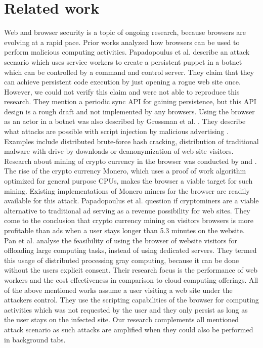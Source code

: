 \documentclass[
	ruledheaders=section,%
	class=report,%
	thesis={type=bachelor},%
	accentcolor=9c,%
	custommargins=true,%
	marginpar=false,%
	parskip=half-,%
	fontsize=11pt,%
]{tudapub}
\begin{document}
  

  
  \newpage
  \chapter{Related work}

  Web and browser security is a topic of ongoing research, because browsers are evolving at a rapid pace. Prior works analyzed how browsers can be used to perform malicious computing activities. Papadopoulus et al. \cite{papadopoulos2018master} describe an attack scenario which uses service workers to create a persistent puppet in a botnet which can be controlled by a command and control server. They claim that they can achieve persistent code execution by just opening a rogue web site once. However, we could not verify this claim and were not able to reproduce this research. They mention a periodic sync API for gaining persistence, but this API design is a rough draft and not implemented by any browsers. Using the browser as an actor in a botnet was also described by Grossman et al. \cite{grossmann2013million}. They describe what attacks are possible with script injection by malicious advertising \cite{wiki:malvertising}. Examples include distributed brute-force hash cracking, distribution of traditional malware with drive-by downloads or deanonymization of web site visitors. Research about mining of crypto currency in the browser was conducted by \cite{eskandari2018first} and \cite{rueth2018digging}. The rise of the crypto currency Monero, which uses a proof of work algorithm optimized for general purpose CPUs, makes the browser a viable target for such mining. Existing implementations of Monero miners for the browser are readily available for this attack. Papadopoulus et al. \cite{papadopoulos2018truth} question if cryptominers are a viable alternative to traditional ad serving as a revenue possibility for web sites. They come to the conclusion that crypto currency mining on visitors browsers is more profitable than ads when a user stays longer than 5.3 minutes on the website. Pan et al. \cite{pan2015gray} analyse the feasibility of using the browser of website visitors for offloading large computing tasks, instead of using dedicated servers. They termed this usage of distributed processing gray computing, because it can be done without the users explicit consent. Their research focus is the performance of web workers and the cost effectiveness in comparison to cloud computing offerings. All of the above mentioned works assume a user visiting a web site under the attackers control. They use the scripting capabilities of the browser for computing activities which was not requested by the user and they only persist as long as the user stays on the infected site. Our research complements all mentioned attack scenario as such attacks are amplified when they could also be performed in background tabs. 
\end{document}
